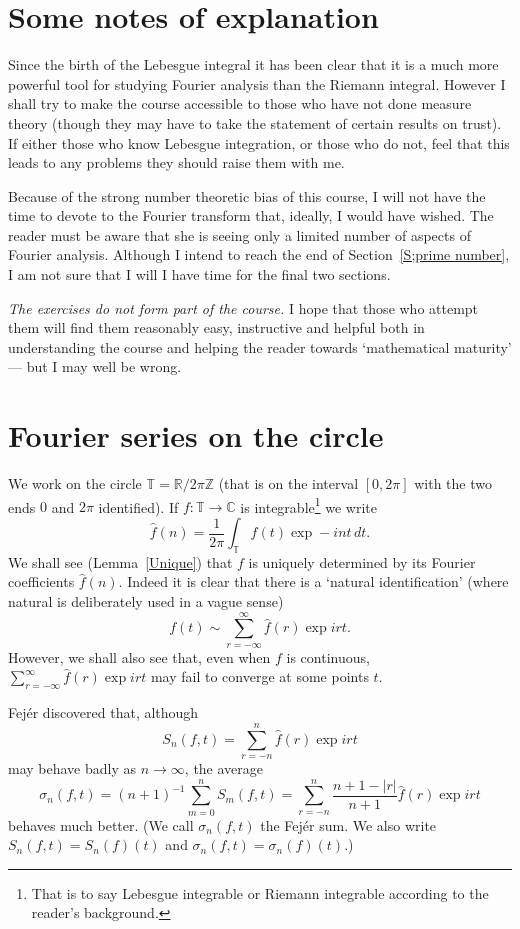 

\section{Some notes of explanation} Since the birth of the
Lebesgue integral it has been clear that it is a much
more powerful tool for studying Fourier analysis
than the Riemann integral. However I shall try to
make the course accessible to those who have not
done measure theory (though they may have to take
the statement of certain results on trust). If
either those who know Lebesgue integration, or
those who do not, feel that this leads to any problems
they should raise them with me.

Because of the strong number theoretic bias of this
course, I will not have the time to devote to
the Fourier transform that, ideally, I would have wished.
The reader must be aware that
she is seeing only a limited number of aspects
of Fourier analysis. Although I intend to reach the end
of Section~\ref{S;prime number}, I am not sure that
I will I have time for the final two sections.

\emph{The exercises do not form part of the course.}
I hope that those who attempt them will
find them reasonably easy, instructive
and helpful both in understanding the course and
helping the reader towards `mathematical maturity'
--- but I may well be wrong.

\section{Fourier series on the circle} We work on the circle
${\mathbb T}={\mathbb R}/2\pi{\mathbb Z}$ (that is on
the interval $[0,2\pi]$ with the two ends $0$ and $2\pi$
identified). If $f:{\mathbb T}\rightarrow{\mathbb C}$
is integrable\footnote{That is
to say Lebesgue integrable
or Riemann integrable according to the reader's
background.} we write
\[\hat{f}(n)=\frac{1}{2\pi}\int_{\mathbb T}f(t)\exp -int\,dt.\]
We shall see (Lemma~\ref{Unique}) that $f$ is uniquely
determined by its Fourier coefficients $\hat{f}(n)$.
Indeed it is clear that there is a `natural identification'
(where natural is deliberately used in a vague sense)
\[f(t)\sim\sum_{r=-\infty}^{\infty}\hat{f}(r)\exp irt.\]
However, we shall also see that, even when $f$ is continuous,
$\sum_{r=-\infty}^{\infty}\hat{f}(r)\exp irt$ may
fail to converge at some points $t$.

Fej\'{e}r discovered that, although
\[S_{n}(f,t)=\sum_{r=-n}^{n}\hat{f}(r)\exp irt\]
may behave badly as $n\rightarrow\infty$, the
average
\[\sigma_{n}(f,t)=(n+1)^{-1}\sum_{m=0}^{n}S_{m}(f,t)
=\sum_{r=-n}^{n}\frac{n+1-|r|}{n+1}\hat{f}(r)\exp irt\]
behaves much better. (We call $\sigma_{n}(f,t)$ the
Fej\'{e}r sum. We also write $S_{n}(f,t)=S_{n}(f)(t)$
and $\sigma_{n}(f,t)=\sigma_{n}(f)(t)$.)

